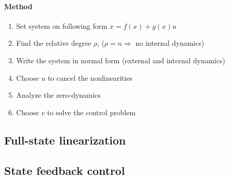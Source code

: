 \paragraph{Method}
\begin{enumerate}
	\item Set system on following form $\dot{x} = f(x)+g(x)u$
	\item Find the relative degree $\rho$, ($\rho = n \Rightarrow$ no internal dynamics)
	\item Write the system in normal form (external and internal dynamics)
	\item Choose $u$ to cancel the nonlinearities
	\item Analyze the zero-dynamics
	\item Choose $v$ to solve the control problem
\end{enumerate}

\subsection{Full-state linearization}

\subsection{State feedback control}


